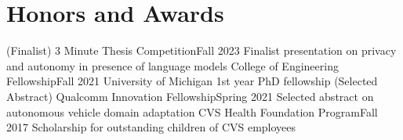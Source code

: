 \section{Honors and Awards}
  \CVSubHeadingListStart
    \CVSubheading
      {(Finalist) 3 Minute Thesis Competition}{Fall 2023}
      {Finalist presentation on privacy and autonomy in presence of language models}{}
    \CVSubheading
      {College of Engineering Fellowship}{Fall 2021}
      {University of Michigan 1st year PhD fellowship}{}
    \CVSubheading
      {(Selected Abstract) Qualcomm Innovation Fellowship}{Spring 2021}
      {Selected abstract on autonomous vehicle domain adaptation}{}
    \CVSubheading
      {CVS Health Foundation Program}{Fall 2017}
      {Scholarship for outstanding children of CVS employees}{}
  \CVSubHeadingListEnd